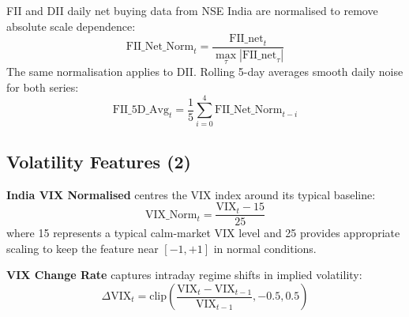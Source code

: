 \documentclass[10pt,a4paper,twoside]{article}
\begin{document}
FII and DII daily net buying data from NSE India are normalised to remove
absolute scale dependence:
\begin{equation}
  \text{FII\_Net\_Norm}_t = \frac{\text{FII\_net}_t}{\max_\tau |\text{FII\_net}_\tau|}
\end{equation}
The same normalisation applies to DII. Rolling 5-day averages smooth daily
noise for both series:
\begin{equation}
  \text{FII\_5D\_Avg}_t = \frac{1}{5}\sum_{i=0}^{4}\text{FII\_Net\_Norm}_{t-i}
\end{equation}

\subsection{Volatility Features (2)}

\textbf{India VIX Normalised} centres the VIX index around its typical baseline:
\begin{equation}
  \text{VIX\_Norm}_t = \frac{\text{VIX}_t - 15}{25}
\end{equation}
where 15 represents a typical calm-market VIX level and 25 provides appropriate
scaling to keep the feature near $[-1, +1]$ in normal conditions.

\textbf{VIX Change Rate} captures intraday regime shifts in implied volatility:
\begin{equation}
  \Delta\text{VIX}_t = \text{clip}\!\left(\frac{\text{VIX}_t - \text{VIX}_{t-1}}
  {\text{VIX}_{t-1}}, -0.5, 0.5\right)
\end{equation}
\end{document}
